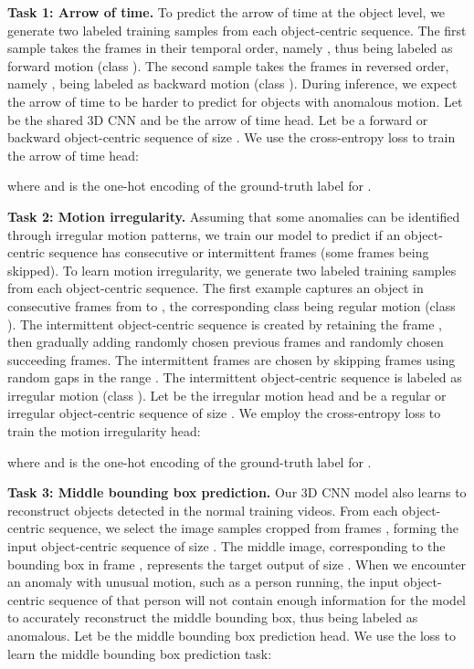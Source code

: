 \documentclass[final]{cvpr}
\begin{document}
\noindent
{\bf Task 1: Arrow of time.}
To predict the arrow of time \cite{Wei-CVPR-2018} at the object level, we generate two labeled training samples from each object-centric sequence. The first sample takes the frames in their temporal order, namely , thus being labeled as forward motion (class ). The second sample takes the frames in reversed order, namely , being labeled as backward motion (class ). During inference, we expect the arrow of time to be harder to predict for objects with anomalous motion.
Let  be the shared 3D CNN and  be the arrow of time head. Let  be a forward or backward object-centric sequence of size . We use the cross-entropy loss to train the arrow of time head:

where  and  is the one-hot encoding of the ground-truth label for .
 
\noindent
{\bf Task 2: Motion irregularity.}
Assuming that some anomalies can be identified through irregular motion patterns, we train our model to predict if an object-centric sequence has consecutive or intermittent frames (some frames being skipped). To learn motion irregularity, we generate two labeled training samples from each object-centric sequence. The first example captures an object in consecutive frames from  to , the corresponding class being regular motion (class ). The intermittent object-centric sequence is created by retaining the frame , then gradually adding  randomly chosen previous frames and  randomly chosen succeeding frames. The intermittent frames are chosen by skipping frames using random gaps in the range . The intermittent object-centric sequence is labeled as irregular motion (class ). Let  be the irregular motion head and  be a regular or irregular object-centric sequence of size . We employ the cross-entropy loss to train the motion irregularity head:

where  and  is the one-hot encoding of the ground-truth label for .

\noindent
{\bf Task 3: Middle bounding box prediction.}
Our 3D CNN model also learns to reconstruct objects detected in the normal training videos. From each object-centric sequence, we select the image samples cropped from frames , forming the input object-centric sequence  of size . The middle image, corresponding to the bounding box in frame , represents the target output  of size . When we encounter an anomaly with unusual motion, such as a person running, the input object-centric sequence of that person will not contain enough information for the model to accurately reconstruct the middle bounding box, thus being labeled as anomalous. Let  be the middle bounding box prediction head. We use the  loss to learn the middle bounding box prediction task:
\end{document}
